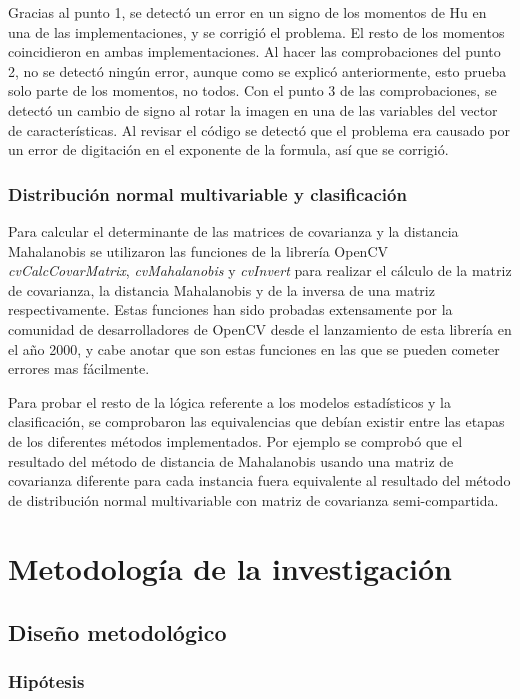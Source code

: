 \documentclass[a4paper, 11pt, oneside]{report}
\begin{document}
Gracias al punto 1, se detectó un error en un signo de los momentos de Hu en una de las implementaciones, y se corrigió el problema. El resto de los momentos coincidieron en ambas implementaciones. Al hacer las comprobaciones del punto 2, no se detectó ningún error, aunque como se explicó anteriormente, esto prueba solo parte de los momentos, no todos. Con el punto 3 de las comprobaciones, se detectó un cambio de signo al rotar la imagen en una de las variables del vector de características. Al revisar el código se detectó que el problema era causado por un error de digitación en el exponente de la formula, así que se corrigió.

\subsection{Distribución normal multivariable y clasificación}

Para calcular el determinante de las matrices de covarianza y la distancia Mahalanobis se utilizaron las funciones de la librería OpenCV {\it cvCalcCovarMatrix}, {\it cvMahalanobis} y {\it cvInvert} para realizar el cálculo de la matriz de covarianza, la distancia Mahalanobis y de la inversa de una matriz respectivamente. Estas funciones han sido probadas extensamente por la comunidad de desarrolladores de OpenCV desde el lanzamiento de esta librería en el año 2000, y cabe anotar que son estas funciones en las que se pueden cometer errores mas fácilmente.

Para probar el resto de la lógica referente a los modelos estadísticos y la clasificación, se comprobaron las equivalencias que debían existir entre las etapas de los diferentes métodos implementados. Por ejemplo se comprobó que el resultado del método de distancia de Mahalanobis usando una matriz de covarianza diferente para cada instancia fuera equivalente al resultado del método de distribución normal multivariable con matriz de covarianza semi-compartida.

\chapter{Metodología de la investigación}
\label{chap:metodology}

\section{Diseño metodológico}

\subsection{Hipótesis}
\end{document}
